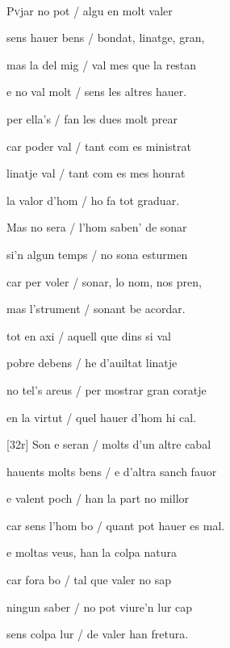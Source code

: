 \documentclass[12pt]{article}
\renewcommand{\espaiAbansEtiquetaPoema}{\vspace{0ex}}
\begin{document}
\begin{estrofa}

\espaiAbansEtiquetaPoema

\\

\end{estrofa}


\begin{estrofa}

 P\textsc{v}jar no pot / algu en molt valer

 sens hauer bens / bondat, linatge, gran,

 mas la del mig / val mes que la restan

 e no val molt / sens les altres hauer.

 per ella's / fan les dues molt prear

 car poder val / tant com es ministrat

 linatje val / tant com es mes honrat

 la valor d'hom / ho fa tot graduar.

\end{estrofa}



\begin{estrofa}

 Mas no sera / l'hom saben' de sonar

 si'n algun temps / no sona esturmen

 car per voler / sonar, lo nom, nos pren,

 mas l'strument / sonant be acordar.

 tot en axi / aquell que dins si val

 pobre debens / he d'auiltat linatje

 no tel's areus / per mostrar gran coratje

 en la virtut / quel hauer d'hom hi cal.

\end{estrofa}



\begin{estrofa}

 [32r] Son e seran / molts d'un altre cabal

 hauents molts bens / e d'altra sanch fauor

 e valent poch / han la part no millor

 car sens l'hom bo / quant pot hauer es mal.

 e moltas veus, han la colpa natura

 car fora bo / tal que valer no sap

 ningun saber / no pot viure'n lur cap

 sens colpa lur / de valer han fretura.

\end{estrofa}
\end{document}
